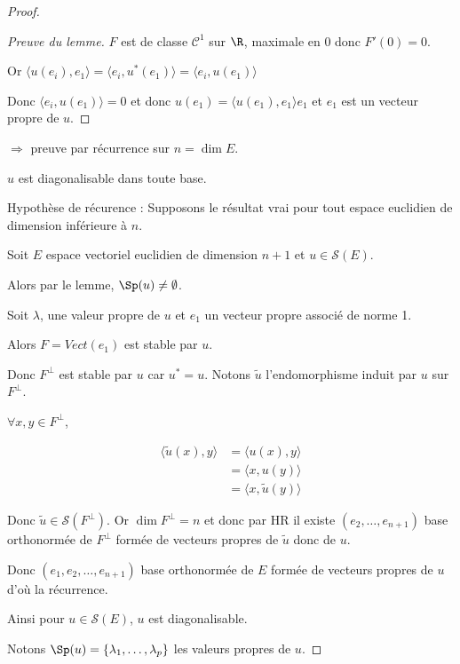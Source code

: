 \begin{proof}
\begin{proof}[Preuve du lemme]
    $F$ est de classe $\mathscr C^1$ sur $\R$, maximale en $0$ donc $F'(0) = 0$. 

    Or $\langle u(e_i), e_1 \rangle = \langle e_i, u^*(e_1) \rangle = \langle e_i, u(e_1) \rangle $ 

    Donc $\langle e_i, u(e_1) \rangle = 0$ et donc $u(e_1) = \langle u(e_1), e_1 \rangle e_1$ et 
    $e_1$ est un vecteur propre de $u$. 

    \end{proof}

    \lvspace $\Rightarrow$ preuve par récurrence sur $n = \dim E$. 

     $u$ est diagonalisable dans toute base. 

    \svspace Hypothèse de récurence : Supposons le résultat vrai pour tout espace euclidien 
    de dimension inférieure à $n$. 

    Soit $E$ espace vectoriel euclidien de dimension $n + 1$ et $u \in \mathscr S(E)$. 

    Alors par le lemme, $\Sp(u) \neq \emptyset$. 

    Soit $\lambda$, une valeur propre de $u$ et $e_1$ un vecteur propre associé de norme 1. 

    Alors $F = Vect (e_1)$ est stable par $u$. 

    Donc $F^\perp$ est stable par $u$ car $u^* = u$. Notons $\tilde u$ l'endomorphisme induit par 
    $u$ sur $F^\perp$.

    $\forall x, y \in F^\perp$, 

    \begin{align}
        \langle \tilde u (x), y \rangle & = \langle u(x), y \rangle  \\
        & = \langle x, u(y) \rangle \\
        & = \langle x, \tilde u (y) \rangle
    \end{align}

    Donc $\tilde u \in \mathscr S(F^\perp)$. Or 
    $\dim F^\perp = n$ et donc par HR il existe 
    $(e_2, \dots, e_{n + 1})$ base orthonormée de $F^\perp$ formée de vecteurs propres de 
    $\tilde u$ donc de $u$. 

    Donc $(e_1, e_2, \dots, e_{n + 1})$ base orthonormée de $E$ formée de vecteurs propres de $u$
    d'où la récurrence. 

    Ainsi pour $u \in \mathscr S(E)$, $u$ est diagonalisable. 

    Notons $\Sp(u) = \{\lambda_1, \dots, \lambda_p\}$ les valeurs propres de $u$.


\end{proof}
